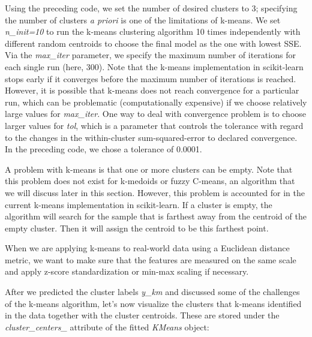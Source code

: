 \documentclass[11pt]{article}
\begin{document}
    Using the preceding code, we set the number of desired clusters to 3;
specifying the number of clusters \emph{a priori} is one of the
limitations of k-means. We set \emph{n\_init=10} to run the k-means
clustering algorithm 10 times independently with different random
centroids to choose the final model as the one with lowest SSE. Via the
\emph{max\_iter} parameter, we specify the maximum number of iterations
for each single run (here, 300). Note that the k-means implementation in
scikit-learn stops early if it converges before the maximum number of
iterations is reached. However, it is possible that k-means does not
reach convergence for a particular run, which can be problematic
(computationally expensive) if we choose relatively large values for
\emph{max\_iter}. One way to deal with convergence problem is to choose
larger values for \emph{tol}, which is a parameter that controls the
tolerance with regard to the changes in the within-cluster
sum-squared-error to declared convergence. In the preceding code, we
chose a tolerance of 0.0001.

A problem with k-means is that one or more clusters can be empty. Note
that this problem does not exist for k-medoids or fuzzy C-means, an
algorithm that we will discuss later in this section. However, this
problem is accounted for in the current k-means implementation in
scikit-learn. If a cluster is empty, the algorithm will search for the
sample that is farthest away from the centroid of the empty cluster.
Then it will assign the centroid to be this farthest point.

    When we are applying k-means to real-world data using a Euclidean
distance metric, we want to make sure that the features are measured on
the same scale and apply z-score standardization or min-max scaling if
necessary.

After we predicted the cluster labels \emph{y\_km} and discussed some of
the challenges of the k-means algorithm, let's now visualize the
clusters that k-means identified in the data together with the cluster
centroids. These are stored under the \emph{cluster\_centers\_}
attribute of the fitted \emph{KMeans} object:
\end{document}
